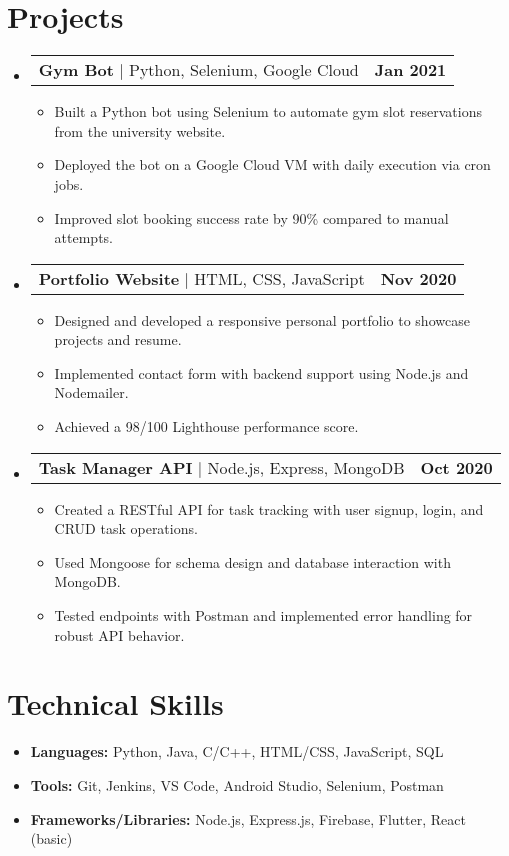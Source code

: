 \documentclass[letterpaper,11pt]{article}
\makeatletter
\newcommand{\resumeItem}[1]{
  \item\small{#1 \vspace{-2pt}}
}
\newcommand{\resumeProjectHeading}[2]{
    \item
    \begin{tabular*}{1.001\textwidth}{l@{\extracolsep{\fill}}r}
      \small#1 & \textbf{\small #2}\\
    \end{tabular*}\vspace{-7pt}
}
\newcommand{\resumeItemListStart}{\begin{itemize}}
\newcommand{\resumeItemListEnd}{\end{itemize}\vspace{-5pt}}
\newcommand{\resumeSubHeadingListStart}{\begin{itemize}[leftmargin=0.0in, label={}]}
\newcommand{\resumeSubHeadingListEnd}{\end{itemize}}
\makeatother
\begin{document}
\section{Projects}
\resumeSubHeadingListStart
  \resumeProjectHeading{\textbf{Gym Bot} $|$ Python, Selenium, Google Cloud}{Jan 2021}
  \resumeItemListStart
    \resumeItem{Built a Python bot using Selenium to automate gym slot reservations from the university website.}
    \resumeItem{Deployed the bot on a Google Cloud VM with daily execution via cron jobs.}
    \resumeItem{Improved slot booking success rate by 90\% compared to manual attempts.}
  \resumeItemListEnd

  \resumeProjectHeading{\textbf{Portfolio Website} $|$ HTML, CSS, JavaScript}{Nov 2020}
  \resumeItemListStart
    \resumeItem{Designed and developed a responsive personal portfolio to showcase projects and resume.}
    \resumeItem{Implemented contact form with backend support using Node.js and Nodemailer.}
    \resumeItem{Achieved a 98/100 Lighthouse performance score.}
  \resumeItemListEnd

  \resumeProjectHeading{\textbf{Task Manager API} $|$ Node.js, Express, MongoDB}{Oct 2020}
  \resumeItemListStart
    \resumeItem{Created a RESTful API for task tracking with user signup, login, and CRUD task operations.}
    \resumeItem{Used Mongoose for schema design and database interaction with MongoDB.}
    \resumeItem{Tested endpoints with Postman and implemented error handling for robust API behavior.}
  \resumeItemListEnd
\resumeSubHeadingListEnd

\section{Technical Skills}
\begin{itemize}[leftmargin=0.15in, label={}]

  \item \textbf{Languages:} Python, Java, C/C++, HTML/CSS, JavaScript, SQL \\
  \item \textbf{Tools:} Git, Jenkins, VS Code, Android Studio, Selenium, Postman \\
  \item \textbf{Frameworks/Libraries:} Node.js, Express.js, Firebase, Flutter, React (basic)
\end{itemize}
\end{document}

